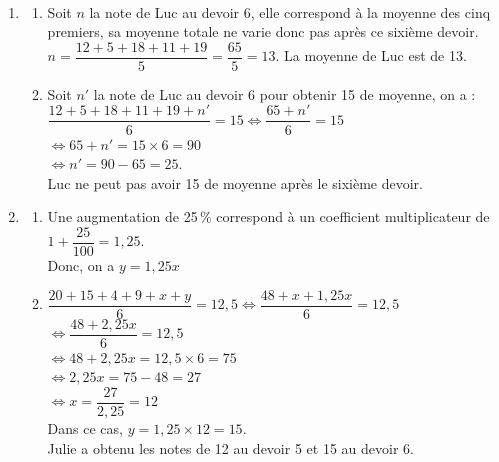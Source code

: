 \begin{corrige}
\ \\ [-5mm]
   \begin{enumerate}
      \item 
         \begin{enumerate}
            \item Soit $n$ la note de Luc au devoir 6, elle correspond à la moyenne des cinq premiers, sa moyenne totale ne varie donc pas après ce sixième devoir. \\ [1mm] 
               $n =\dfrac{12+5+18+11+19}{5} =\dfrac{65}{5} =13$. {\blue La moyenne de Luc est de 13}. \smallskip 
            \item Soit $n'$ la note de Luc au devoir 6 pour obtenir 15 de moyenne, on a : \\ [1mm]    
               $\dfrac{12+5+18+11+19+n'}{6} =15 \iff \dfrac{65+n'}{6}=15$ \\ [2mm]
               \hspace*{4.6cm} $\iff 65+n' =15\times6 =90$ \\ [1mm]
               \hspace*{4.6cm} $\iff n' =90-65 =25$. \\
               {\blue Luc ne peut pas avoir 15 de moyenne après le sixième devoir.}
         \end{enumerate}
      \setcounter{enumi}{1}
      \item
         \begin{enumerate}
            \item Une augmentation de 25\,\% correspond à un coefficient multiplicateur de $1+\dfrac{25}{100} =1,25$. \\
               Donc, on a {\blue $y=1,25x$} \medskip
            \item $\dfrac{20+15+4+9+x+y}{6} =12,5 \iff \dfrac{48+x+1,25x}{6}=12,5$ \\ [2mm]
               \hspace*{4.95cm} $\iff \dfrac{48+2,25x}{6} =12,5$ \\ [2mm]
               \hspace*{4.95cm} $\iff 48+2,25x =12,5\times6 =75$ \\ [1mm]
               \hspace*{4.95cm} $\iff 2,25x =75-48 =27$ \\ [2mm]
               \hspace*{4.95cm} $ \iff x =\dfrac{27}{2,25} =12$ \\ [1mm]
               Dans ce cas, $y=1,25\times12 =15$. \\         
               {\blue Julie a obtenu les notes de 12 au devoir 5 et 15 au devoir 6.}
         \end{enumerate}
   \end{enumerate}
\end{corrige}

